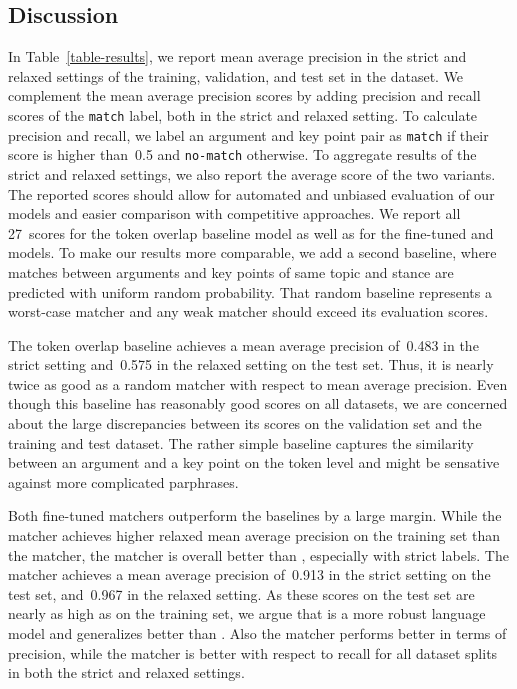 \subsection{Discussion}
In Table~\ref{table-results}, we report mean average precision in the strict and relaxed settings of the training, 
validation, and test set in the \ArgKP dataset.
We complement the mean average precision scores by adding precision and recall scores of the \texttt{match} label, 
both in the strict and relaxed setting. To calculate precision and recall, we label an argument and key point pair as \texttt{match} if their score is higher than~0.5 and \texttt{no-match} otherwise.
To aggregate results of the strict and relaxed settings, we also report the average score of the two variants.
The reported scores should allow for automated and unbiased evaluation of our models and easier comparison with competitive approaches.
We report all 27~scores for the token overlap baseline model as well as for the fine-tuned \BertBase and \RobertaBase models.
To make our results more comparable, we add a second baseline, where matches between arguments and key points of same 
topic and stance are predicted with uniform random probability.
That random baseline represents a worst-case matcher and any weak matcher should exceed its evaluation scores.

The token overlap baseline achieves a mean average precision of~0.483 in the strict setting and~0.575 in the relaxed 
setting on the test set.
Thus, it is nearly twice as good as a random matcher with respect to mean average precision.
Even though this baseline has reasonably good scores on all datasets, we are concerned about the large discrepancies 
between its scores on the validation set and the training and test dataset. 
The rather simple baseline captures the similarity between an argument and a key point on the token level and might be sensative against more complicated parphrases.

Both fine-tuned matchers outperform the baselines by a large margin.
While the \BertBase matcher achieves higher relaxed mean average precision on the training set than the \RobertaBase 
matcher, the \RobertaBase matcher is overall better than \Bert, especially with strict labels.
The \RobertaBase matcher achieves a mean average precision of~0.913 in the strict setting on the test set, and~0.967 
in the relaxed setting.
As these scores on the test set are nearly as high as on the training set, we argue that \Roberta is a more robust 
language model and generalizes better than \Bert.
Also the \RobertaBase matcher performs better in terms of precision, while the \BertBase matcher is better with respect to 
recall for all dataset splits in both the strict and relaxed settings.
